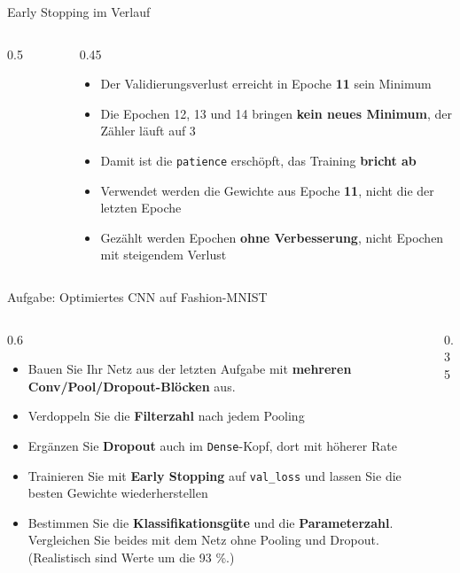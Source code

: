 \begin{frame}{Early Stopping im Verlauf}
\footnotesize
\begin{columns}
\begin{column}{0.5\linewidth}
\begin{figure}
\centering

\end{figure}
\end{column}
\begin{column}{0.45\linewidth}
\begin{itemize}
  \item Der Validierungsverlust erreicht in Epoche \textbf{11} sein Minimum
  \item Die Epochen 12, 13 und 14 bringen \textbf{kein neues Minimum}, der Zähler läuft auf 3
  \item Damit ist die \texttt{patience} erschöpft, das Training \textbf{bricht ab}
  \item Verwendet werden die Gewichte aus Epoche \textbf{11}, nicht die der letzten Epoche
  \item Gezählt werden Epochen \textbf{ohne Verbesserung}, nicht Epochen mit steigendem Verlust
\end{itemize}
\end{column}
\end{columns}
\end{frame}


\makequizpage{\QUIZURL}{\QUIZQRCODE}{\QUIZIMAGE}
\makequestionspage{\FRAGENIMAGE}

\begin{frame}{Aufgabe: Optimiertes CNN auf Fashion-MNIST}
\footnotesize
\begin{columns}
\begin{column}{0.6\linewidth}
\begin{itemize}
  \item Bauen Sie Ihr Netz aus der letzten Aufgabe mit \textbf{mehreren Conv/Pool/Dropout-Blöcken} aus.
  \item Verdoppeln Sie die \textbf{Filterzahl} nach jedem Pooling
  \item Ergänzen Sie \textbf{Dropout} auch im \texttt{Dense}-Kopf, dort mit höherer Rate
  \item Trainieren Sie mit \textbf{Early Stopping} auf \texttt{val\_loss} und lassen Sie die besten Gewichte wiederherstellen
  \item Bestimmen Sie die \textbf{Klassifikationsgüte} und die \textbf{Parameterzahl}. Vergleichen Sie beides mit dem Netz ohne Pooling und Dropout. (Realistisch sind Werte um die 93 \%.)
\end{itemize}
\end{column}
\begin{column}{0.35\linewidth}
\begin{center}
\end{center}
\end{column}
\end{columns}
\end{frame}


